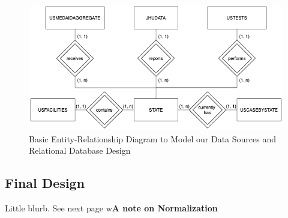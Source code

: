 \documentclass[11pt]{article}
\begin{document}
\FloatBarrier
\begin{figure}[h]
    \centering
    \includegraphics[width=\textwidth]{diagrams/ER2.png}
    \caption{Basic Entity-Relationship Diagram to Model our Data Sources and Relational Database Design}
    \label{fig:er1}
\end{figure}
\FloatBarrier

\subsection{Final Design}

\noindent
Little blurb. See next page w\textbf{A note on Normalization}
\pagebreak
\end{document}
